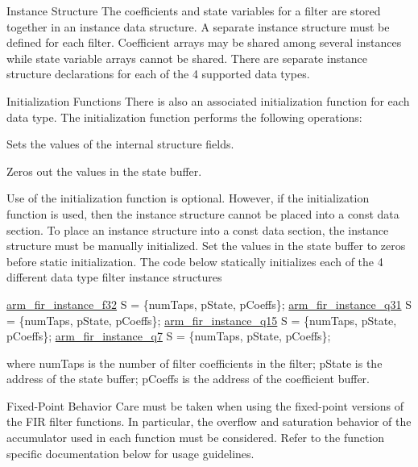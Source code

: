 \begin{DoxyParagraph}{Instance Structure }
The coefficients and state variables for a filter are stored together in an instance data structure. A separate instance structure must be defined for each filter. Coefficient arrays may be shared among several instances while state variable arrays cannot be shared. There are separate instance structure declarations for each of the 4 supported data types.
\end{DoxyParagraph}
\begin{DoxyParagraph}{Initialization Functions }
There is also an associated initialization function for each data type. The initialization function performs the following operations\-:
\begin{DoxyItemize}
\item Sets the values of the internal structure fields.
\item Zeros out the values in the state buffer.
\end{DoxyItemize}
\end{DoxyParagraph}
\begin{DoxyParagraph}{}
Use of the initialization function is optional. However, if the initialization function is used, then the instance structure cannot be placed into a const data section. To place an instance structure into a const data section, the instance structure must be manually initialized. Set the values in the state buffer to zeros before static initialization. The code below statically initializes each of the 4 different data type filter instance structures 
\begin{DoxyPre}   
\hyperlink{structarm__fir__instance__f32}{arm\_fir\_instance\_f32} S = \{numTaps, pState, pCoeffs\};   
\hyperlink{structarm__fir__instance__q31}{arm\_fir\_instance\_q31} S = \{numTaps, pState, pCoeffs\};   
\hyperlink{structarm__fir__instance__q15}{arm\_fir\_instance\_q15} S = \{numTaps, pState, pCoeffs\};   
\hyperlink{structarm__fir__instance__q7}{arm\_fir\_instance\_q7} S =  \{numTaps, pState, pCoeffs\};   
 \end{DoxyPre}

\end{DoxyParagraph}
where {\ttfamily num\-Taps} is the number of filter coefficients in the filter; {\ttfamily p\-State} is the address of the state buffer; {\ttfamily p\-Coeffs} is the address of the coefficient buffer.

\begin{DoxyParagraph}{Fixed-\/\-Point Behavior }
Care must be taken when using the fixed-\/point versions of the F\-I\-R filter functions. In particular, the overflow and saturation behavior of the accumulator used in each function must be considered. Refer to the function specific documentation below for usage guidelines. 
\end{DoxyParagraph}


